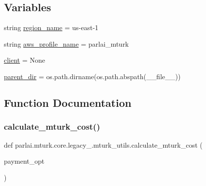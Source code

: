 \subsection*{Variables}
\begin{DoxyCompactItemize}
\item 
string \hyperlink{namespaceparlai_1_1mturk_1_1core_1_1legacy__2018_1_1mturk__utils_ae5c2cdae6d31c71a182db743cd0f20b2}{region\+\_\+name} = \textquotesingle{}us-\/east-\/1\textquotesingle{}
\item 
string \hyperlink{namespaceparlai_1_1mturk_1_1core_1_1legacy__2018_1_1mturk__utils_a0005975c5569e1cee4b2f4469a7c0577}{aws\+\_\+profile\+\_\+name} = \textquotesingle{}parlai\+\_\+mturk\textquotesingle{}
\item 
\hyperlink{namespaceparlai_1_1mturk_1_1core_1_1legacy__2018_1_1mturk__utils_a35eea1b231a5600c0a82176fd2a023a0}{client} = None
\item 
\hyperlink{namespaceparlai_1_1mturk_1_1core_1_1legacy__2018_1_1mturk__utils_a90c8f0752571a5e4decf9077aab60c8b}{parent\+\_\+dir} = os.\+path.\+dirname(os.\+path.\+abspath(\+\_\+\+\_\+file\+\_\+\+\_\+))
\end{DoxyCompactItemize}


\subsection{Function Documentation}
\mbox{\label{namespaceparlai_1_1mturk_1_1core_1_1legacy__2018_1_1mturk__utils_a2c1cd16e531345372d5ec5c858bd74f2}} 
\subsubsection{\texorpdfstring{calculate\+\_\+mturk\+\_\+cost()}{calculate\_mturk\_cost()}}
{\footnotesize\ttfamily def parlai.\+mturk.\+core.\+legacy\+\_.\+mturk\+\_\+utils.\+calculate\+\_\+mturk\+\_\+cost (\begin{DoxyParamCaption}\item[{}]{payment\+\_\+opt }\end{DoxyParamCaption})}

